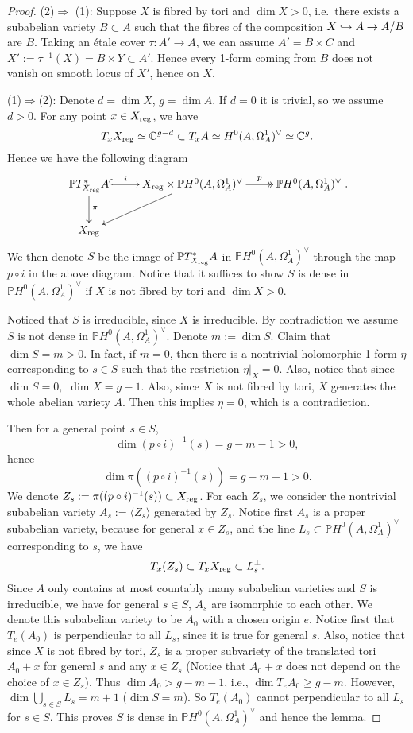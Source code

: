 \documentclass[a4paper,12pt,reqno]{amsart}
\theoremstyle{plain}
\theoremstyle{remark}
\newcommand{\C}{\mathbb C}
\renewcommand{\cong}{\simeq}
\newcommand{\into}{\hookrightarrow}
\newcommand{\onto}{\rightarrow\hspace*{-.14in}\rightarrow}
\begin{document}
\begin{proof}\label{proof:van-nonsimple} (2)$\Rightarrow$ (1): Suppose $X$ is fibred by tori and $\dim X>0$, i.e.\ there exists a subabelian variety $B\subset A$ such that the fibres of the composition 
$X\into A \onto A/B$ are $B$. Taking an \'etale cover $\tau: A'\to A$, we can assume $A'=B\times C$ and $X':=\tau^{-1}(X)=B\times Y\subset A'$. Hence every 1-form coming from $B$ does not vanish on smooth locus of $X'$, hence on $X$. 

(1)$\Rightarrow$(2): Denote $d=\dim X$, $g=\dim A$. If $d=0$ it is trivial, so we assume $d>0$. For any point $x\in X_{\textnormal{reg}}$, we have $$T_xX_{\textnormal{reg}}\cong \C^{g-d}\subset T_xA\cong H^0(A, \Omega_A^1)^{\vee}\cong \C^g.$$
Hence we have the following diagram 
$$\xymatrix{
\mathbb{P}T^*_{X_{\textnormal{reg}}}A \ar[d]^{\pi} \ar@{^{(}->}[r]^-i
&X_{\textnormal{reg}}\times \mathbb{P}H^0(A, \Omega_A^1)^{\vee}\ar[dl] \ar@{->>}[r]^-p&\mathbb{P}H^0(A, \Omega_A^1)^{\vee} \\
X_{\textnormal{reg}}
}.$$
We then denote $S$ be the image of $\mathbb{P}T^*_{X_{\textnormal{reg}}}A$ in $\mathbb{P}H^0(A, \Omega_A^1)^{\vee}$ through the map $p\circ i$ in the above diagram. Notice that it suffices to show $S$ is dense in $\mathbb{P}H^0(A, \Omega_A^1)^{\vee}$ if $X$ is not fibred by tori and $\dim X>0$.  

Noticed that $S$ is irreducible, since $X$ is irreducible. By contradiction we assume $S$ is not dense in $\mathbb{P}H^0(A, \Omega_A^1)^{\vee}$. Denote $m:=\dim S$. Claim that $\dim S=m>0$. In fact, if $m=0$, then there is a nontrivial holomorphic 1-form $\eta$ corresponding to $s\in S$ such that the restriction $\eta|_X=0$. Also, notice that since $\dim S=0,$ $\dim X=g-1$. Also, since $X$ is not fibred by tori, $X$ generates the whole abelian variety $A$. Then this implies $\eta=0$, which is a contradiction. 

Then for a general point $s\in S$, $$\dim (p\circ i)^{-1}(s)=g-m-1>0,$$ hence $$\dim \pi((p\circ i)^{-1}(s))=g-m-1>0.$$ We denote $Z_s:= \pi((p\circ i)^{-1}(s))\subset X_{\textnormal{reg}}$. For each $Z_s$, we consider the nontrivial subabelian variety $A_s:=\langle Z_s \rangle$ generated by $Z_s$.  Notice first $A_s$ is a proper subabelian variety, because for general $x\in Z_s$, and the line $L_s\subset \mathbb{P}H^0(A, \Omega_A^1)^{\vee}$ corresponding to $s$, we have $$T_x(Z_s)\subset T_xX_{\textnormal{reg}}\subset L_s^{\perp}.$$
Since $A$ only contains at most countably many subabelian varieties and $S$ is irreducible, we have for general $s\in S$, $A_s$ are isomorphic to each other.  We denote this subabelian variety to be $A_0$ with a chosen origin $e$. Notice first that $T_e(A_0)$ is perpendicular to all $L_s$, since it is true for general $s$. Also, notice that since $X$ is not fibred by tori, $Z_s$ is a proper subvariety of the translated tori $A_0+x$ for general $s$ and any $x\in Z_s$ (Notice that $A_0+x$ does not depend on the choice of $x\in Z_s$). Thus $\dim A_0>g-m-1$, i.e., $\dim T_eA_0\geq g-m$. However, $\dim \bigcup_{s\in S}L_s=m+1$ ($\dim S=m$). So $T_e(A_0)$ cannot perpendicular to all $L_s$ for $s\in S$. This proves $S$ is dense in $\mathbb{P}H^0(A, \Omega_A^1)^{\vee}$ and hence the lemma.
\end{proof}
\end{document}
